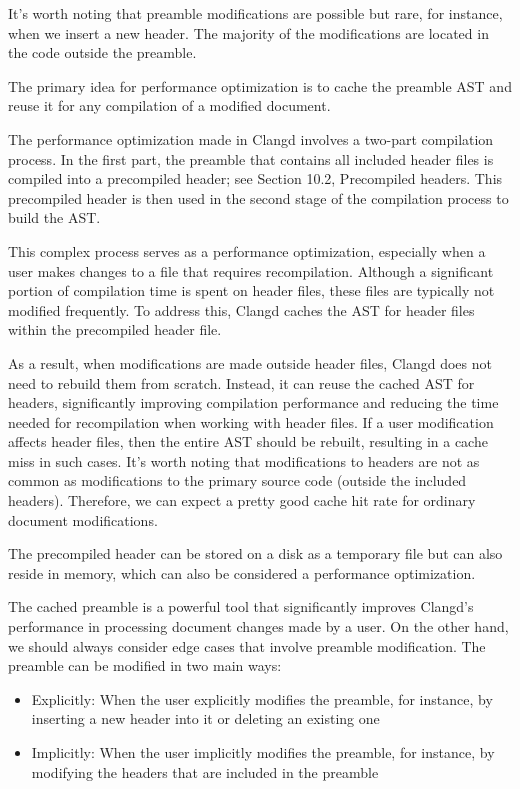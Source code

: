 It's worth noting that preamble modifications are possible but rare, for instance, when we insert a new header. The majority of the modifications are located in the code outside the preamble.

The primary idea for performance optimization is to cache the preamble AST and reuse it for any compilation of a modified document.


The performance optimization made in Clangd involves a two-part compilation process. In the first part, the preamble that contains all included header files is compiled into a precompiled header; see Section 10.2, Precompiled headers. This precompiled header is then used in the second stage of the compilation process to build the AST.

This complex process serves as a performance optimization, especially when a user makes changes to a file that requires recompilation. Although a significant portion of compilation time is spent on header files, these files are typically not modified frequently. To address this, Clangd caches the AST for header files within the precompiled header file.

As a result, when modifications are made outside header files, Clangd does not need to rebuild them from scratch. Instead, it can reuse the cached AST for headers, significantly improving compilation performance and reducing the time needed for recompilation when working with header files. If a user modification affects header files, then the entire AST should be rebuilt, resulting in a cache miss in such cases. It's worth noting that modifications to headers are not as common as modifications to the primary source code (outside the included headers). Therefore, we can expect a pretty good cache hit rate for ordinary document modifications.

The precompiled header can be stored on a disk as a temporary file but can also reside in memory, which can also be considered a performance optimization.

The cached preamble is a powerful tool that significantly improves Clangd's performance in processing document changes made by a user. On the other hand, we should always consider edge cases that involve preamble modification. The preamble can be modified in two main ways:

\begin{itemize}
\item
Explicitly: When the user explicitly modifies the preamble, for instance, by inserting a new header into it or deleting an existing one

\item
Implicitly: When the user implicitly modifies the preamble, for instance, by modifying the headers that are included in the preamble
\end{itemize}

